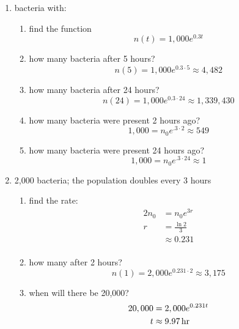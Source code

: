 \documentclass{exam}
\begin{document}
  \begin{enumerate}
    \item bacteria with:

      \begin{enumerate}[a]
        \item find the function 
          \[
            n(t) = 1,000 e^{0.3 t}
          \]

        \item how many bacteria after 5 hours? 
          \[
            n(5) = 1,000 e^{0.3 \cdot 5} \approx 4,482
          \]

        \item how many bacteria after 24 hours? 
          \[
            n(24) = 1,000 e^{0.3 \cdot 24} \approx 1,339,430
          \]

        \item how many bacteria were present 2 hours ago? 
          \[
            1,000 = n_0 e^{.3 \cdot 2} \approx 549 
          \]

        \item how many bacteria were present 24 hours ago? 
          \[
            1,000 = n_0 e^{.3 \cdot 24} \approx 1 
          \]

      \end{enumerate}

    \item 2,000 bacteria; the population doubles every 3 hours
      
      \begin{enumerate}[a]
        \item find the rate:
          \begin{align*}
            2n_0 & = n_0 e^{3r} \\
            r    & = \frac{\ln 2}{3} \\
                 & \approx 0.231 \\
          \end{align*}

        \item how many after 2 hours?
          \[
            n(1) = 2,000 e^{0.231 \cdot 2} \approx 3,175
          \]

        \item when will there be 20,000?
          \begin{align*}
            20,000 &= 2,000 e^{0.231 t} \\
            t &\approx \unit[9.97]{hr} \\
          \end{align*}

      \end{enumerate}
      
  \end{enumerate}
\end{document}
